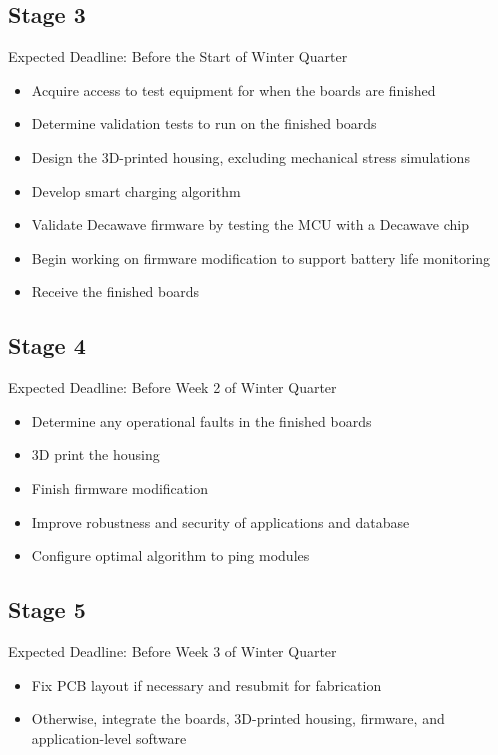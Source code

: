 \documentclass{article}
\begin{document}
\subsection{Stage 3}
Expected Deadline: Before the Start of Winter Quarter \\
\begin{itemize}
\item Acquire access to test equipment for when the boards are finished
\item Determine validation tests to run on the finished boards
\item Design the 3D-printed housing, excluding mechanical stress simulations
\item Develop smart charging algorithm
\item Validate Decawave firmware by testing the MCU with a Decawave chip
\item Begin working on firmware modification to support battery life monitoring
\item Receive the finished boards
\end{itemize}

\subsection{Stage 4}
Expected Deadline: Before Week 2 of Winter Quarter \\
\begin{itemize}
\item Determine any operational faults in the finished boards
\item 3D print the housing
\item Finish firmware modification
\item Improve robustness and security of applications and database
\item Configure optimal algorithm to ping modules
\end{itemize}

\subsection{Stage 5}
Expected Deadline: Before Week 3 of Winter Quarter \\
\begin{itemize}
\item Fix PCB layout if necessary and resubmit for fabrication
\item Otherwise, integrate the boards, 3D-printed housing, firmware, and application-level software
\end{itemize}
\end{document}
